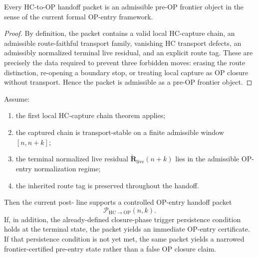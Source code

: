 \begin{proposition}
\label{prop:handoff-packets-are-admissible-pre-op-frontier-objects}
Every HC-to-OP handoff packet is an admissible pre-OP frontier object in the sense of the current formal OP-entry framework.
\end{proposition}

\begin{proof}
By definition, the packet contains a valid local HC-capture chain, an admissible route-faithful transport family, vanishing HC transport defects, an admissibly normalized terminal live residual, and an explicit route tag. These are precisely the data required to prevent three forbidden moves: erasing the route distinction, re-opening a boundary stop, or treating local capture as OP closure without transport. Hence the packet is admissible as a pre-OP frontier object.
\end{proof}

\begin{theorem}
\label{thm:first-transport-stable-hc-capture-to-op-entry-criterion}
Assume:
\begin{enumerate}[leftmargin=2em,label=(\alph*)]
 \item the first local HC-capture chain theorem applies;
 \item the captured chain is transport-stable on a finite admissible window $[n,n+k]$;
 \item the terminal normalized live residual $\widetilde{\mathbf R}_{\mathrm{live}}(n+k)$ lies in the admissible OP-entry normalization regime;
 \item the inherited route tag is preserved throughout the handoff.
\end{enumerate}
Then the current post- line supports a controlled OP-entry handoff packet
\[
 \mathcal P_{\mathrm{HC}\to\mathrm{OP}}(n,k).
\]
If, in addition, the already-defined closure-phase trigger persistence condition holds at the terminal state, the packet yields an immediate OP-entry certificate. If that persistence condition is not yet met, the same packet yields a narrowed frontier-certified pre-entry state rather than a false OP closure claim.
\end{theorem}

